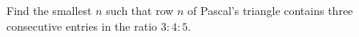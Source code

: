 Find the smallest $n$ such that row $n$ of Pascal's triangle contains three consecutive entries in the ratio $3:4:5$.
